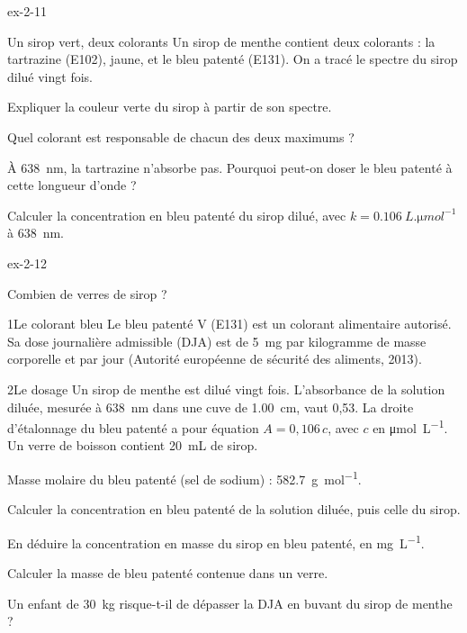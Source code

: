 \begin{blocLivre}{ex-2-11}
\begin{exercice}[2]{Un sirop vert, deux colorants}
Un sirop de menthe contient deux colorants : la tartrazine (E102), jaune, et le bleu patenté (E131). On a tracé le spectre
du sirop dilué vingt fois.
\begin{questions}
\item Expliquer la couleur verte du sirop à partir de son spectre.
\item Quel colorant est responsable de chacun des deux maximums ?
\item À \qty{638}{nm}, la tartrazine n'absorbe pas. Pourquoi peut-on doser le bleu patenté à cette longueur d'onde ?
\item Calculer la concentration en bleu patenté du sirop dilué, avec $k=\qty{0,106}{L.\micro mol^{-1}}$ à \qty{638}{nm}.
\end{questions}
\end{exercice}
\end{blocLivre}
\begin{blocLivre}{ex-2-12}
\begin{exercice}[3]{Combien de verres de sirop ?}
\begin{docu}{1}{Le colorant bleu}
Le bleu patenté V (E131) est un colorant alimentaire autorisé. Sa dose journalière admissible (DJA) est de \qty{5}{mg} par
kilogramme de masse corporelle et par jour (Autorité européenne de sécurité des aliments, 2013).
\end{docu}
\begin{docu}{2}{Le dosage}
Un sirop de menthe est dilué vingt fois. L'absorbance de la solution diluée, mesurée à \qty{638}{nm} dans une cuve de \qty{1,00}{cm},
vaut 0,53. La droite d'étalonnage du bleu patenté a pour équation $A=0{,}106\,c$, avec $c$ en \unit{\micro mol.L^{-1}}. Un verre de
boisson contient \qty{20}{mL} de sirop.
\end{docu}
\begin{donnees}
Masse molaire du bleu patenté (sel de sodium) : \qty{582,7}{g.mol^{-1}}.
\end{donnees}
\begin{questions}
\item Calculer la concentration en bleu patenté de la solution diluée, puis celle du sirop.
\item En déduire la concentration en masse du sirop en bleu patenté, en \unit{mg.L^{-1}}.
\item Calculer la masse de bleu patenté contenue dans un verre.
\item \initiative Un enfant de \qty{30}{kg} risque-t-il de dépasser la DJA en buvant du sirop de menthe ?
\end{questions}
\end{exercice}
\end{blocLivre}
